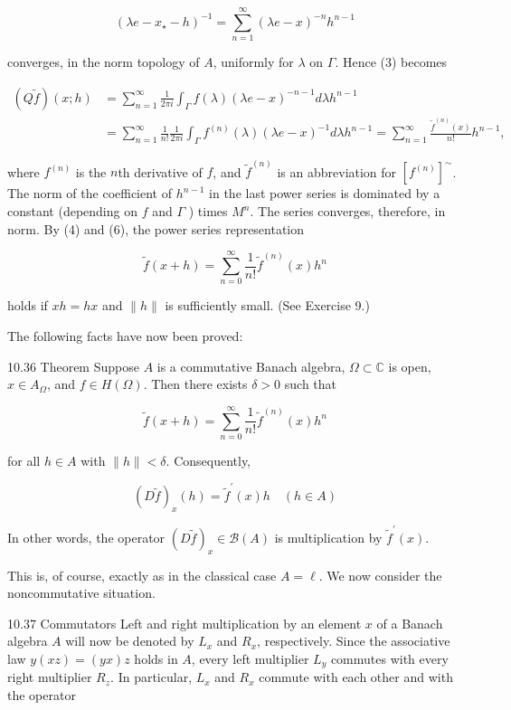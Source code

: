 \documentclass[10pt]{article}
\begin{document}
$$
\left(\lambda e-x_{\star}-h\right)^{-1}=\sum_{n=1}^{\infty}(\lambda e-x)^{-n} h^{n-1}
$$

converges, in the norm topology of $A$, uniformly for $\lambda$ on $\Gamma$. Hence (3) becomes

$$
\begin{aligned}
(Q \tilde{f})(x ; h) & =\sum_{n=1}^{\infty} \frac{1}{2 \pi i} \int_{\Gamma} f(\lambda)(\lambda e-x)^{-n-1} d \lambda h^{n-1} \\
& =\sum_{n=1}^{\infty} \frac{1}{n !} \frac{1}{2 \pi i} \int_{\Gamma} f^{(n)}(\lambda)(\lambda e-x)^{-1} d \lambda h^{n-1}=\sum_{n=1}^{\infty} \frac{\tilde{f}^{(n)}(x)}{n !} h^{n-1},
\end{aligned}
$$

where $f^{(n)}$ is the $n$th derivative of $f$, and $\tilde{f}^{(n)}$ is an abbreviation for $\left[f^{(n)}\right]^{\sim}$. The norm of the coefficient of $h^{n-1}$ in the last power series is dominated by a constant (depending on $f$ and $\Gamma$ ) times $M^{n}$. The series converges, therefore, in norm. By (4) and (6), the power series representation

$$
\tilde{f}(x+h)=\sum_{n=0}^{\infty} \frac{1}{n !} \tilde{f}^{(n)}(x) h^{n}
$$

holds if $x h=h x$ and $\|h\|$ is sufficiently small. (See Exercise 9.)

The following facts have now been proved:

10.36 Theorem Suppose $A$ is a commutative Banach algebra, $\Omega \subset \mathbb{C}$ is open, $x \in A_{\Omega}$, and $f \in H(\Omega)$. Then there exists $\delta>0$ such that

$$
\tilde{f}(x+h)=\sum_{n=0}^{\infty} \frac{1}{n !} \tilde{f}^{(n)}(x) h^{n}
$$

for all $h \in A$ with $\|h\|<\delta$. Consequently,

$$
(D \tilde{f})_{x}(h)=\tilde{f}^{\prime}(x) h \quad(h \in A)
$$

In other words, the operator $(D \tilde{f})_{x} \in \mathscr{B}(A)$ is multiplication by $\tilde{f}^{\prime}(x)$.

This is, of course, exactly as in the classical case $A=\ell$. We now consider the noncommutative situation.

10.37 Commutators Left and right multiplication by an element $x$ of a Banach algebra $A$ will now be denoted by $L_{x}$ and $R_{x}$, respectively. Since the associative law $y(x z)=(y x) z$ holds in $A$, every left multiplier $L_{y}$ commutes with every right multiplier $R_{z}$. In particular, $L_{x}$ and $R_{x}$ commute with each other and with the operator
\end{document}
